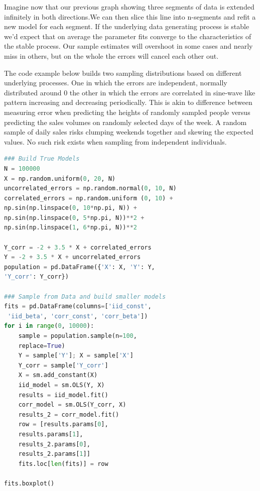 \documentclass[10pt,a4paper,notitlepage, twocolumn]{article}
\begin{document}
\noindent Imagine now that our previous graph showing three segments of data is extended infinitely in both directions.We can then slice this line into n-segments and refit a new model for each segment. If the underlying data generating process is stable we'd expect that on average the parameter fits converge to the characteristics of the stable process. Our sample estimates will overshoot in some cases and nearly miss in others, but on the whole the errors will cancel each other out.
\newline

The code example below builds two sampling distributions based on different underlying processes.  One in which the errors are independent, normally distributed around 0 the other in which the errors are correlated in sine-wave like pattern increasing and decreasing periodically. This is akin to difference between measuring error when predicting the heights of randomly sampled people versus predicting the sales volumes on randomly selected days of the week. A random sample of daily sales  risks clumping weekends together and skewing the expected values. No such risk exists when sampling from independent individuals. 

\begin{lstlisting}[language=Python]
### Build True Models
N = 100000
X = np.random.uniform(0, 20, N)
uncorrelated_errors = np.random.normal(0, 10, N)
correlated_errors = np.random.uniform (0, 10) + 
np.sin(np.linspace(0, 10*np.pi, N)) + 
np.sin(np.linspace(0, 5*np.pi, N))**2 + 
np.sin(np.linspace(1, 6*np.pi, N))**2

Y_corr = -2 + 3.5 * X + correlated_errors
Y = -2 + 3.5 * X + uncorrelated_errors
population = pd.DataFrame({'X': X, 'Y': Y, 
'Y_corr': Y_corr})

### Sample from Data and build smaller models
fits = pd.DataFrame(columns=['iid_const',
 'iid_beta', 'corr_const', 'corr_beta'])
for i in range(0, 10000):
    sample = population.sample(n=100, 
    replace=True)
    Y = sample['Y']; X = sample['X']
    Y_corr = sample['Y_corr']
    X = sm.add_constant(X)
    iid_model = sm.OLS(Y, X)
    results = iid_model.fit()
    corr_model = sm.OLS(Y_corr, X)
    results_2 = corr_model.fit()
    row = [results.params[0], 
    results.params[1],
    results_2.params[0], 
    results_2.params[1]]
    fits.loc[len(fits)] = row
    
fits.boxplot()
\end{lstlisting}
\end{document}
